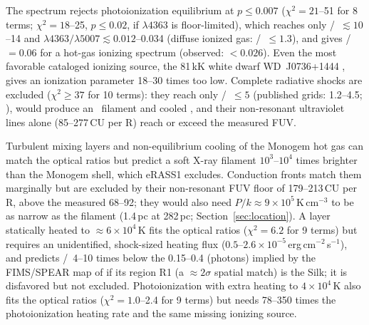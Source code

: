 The spectrum rejects photoionization equilibrium at $p\le0.007$ ($\chi^2=21$--51 for 8 terms; $\chi^2=18$--25, $p\le0.02$, if $\lambda4363$ is floor-limited), which reaches only \Oiii/\Hb\ $\lesssim10$--14 and $\lambda4363/\lambda5007\lesssim0.012$--0.034 (diffuse ionized gas: \Oiii/\Hb\ $\le1.3$), and gives /\Oiii\ $=0.06$ for a hot-gas ionizing spectrum (observed: $<0.026$). Even the most favorable cataloged ionizing source, the 81\,kK white dwarf WD~J0736+1444 \citep{Reindl2023}, gives an ionization parameter 18--30 times too low. Complete radiative shocks are excluded ($\chi^2\ge37$ for 10 terms): they reach only \Oiii/\Hb\ $\le5$ (published grids: 1.2--4.5; \citealt{Raymond1979,Cox1985,Dopita1996,Allen2008}), would produce an \Ha\ filament and cooled , and their non-resonant ultraviolet lines alone (85--277\,CU per R) reach or exceed the measured FUV.

Turbulent mixing layers \citep{Slavin1993} and non-equilibrium cooling of the Monogem hot gas \citep{Gnat2007} can match the optical ratios but predict a soft X-ray filament $10^3$--$10^4$ times brighter than the Monogem shell, which eRASS1 excludes. Conduction fronts \citep{Borkowski1990} match them marginally but are excluded by their non-resonant FUV floor of 179--213\,CU per R, above the measured 68--92; they would also need $P/k\approx9\times10^5$\,K\,cm$^{-3}$ to be as narrow as the filament (1.4\,pc at 282\,pc; Section~\ref{sec:location}). A layer statically heated to $\approx6\times10^4$\,K fits the optical ratios ($\chi^2=6.2$ for 9 terms) but requires an unidentified, shock-sized heating flux ($0.5$--$2.6\times10^{-5}$\,erg\,cm$^{-2}$\,s$^{-1}$), and predicts /\Oiii\ 4--10 times below the 0.15--0.4 (photons) implied by the FIMS/SPEAR map of \citet{Kim2007} if its region R1 (a $\approx2\sigma$ spatial match) is the Silk; it is disfavored but not excluded. Photoionization with extra heating to $4\times10^4$\,K also fits the optical ratios ($\chi^2=1.0$--2.4 for 9 terms) but needs 78--350 times the photoionization heating rate and the same missing ionizing source.

